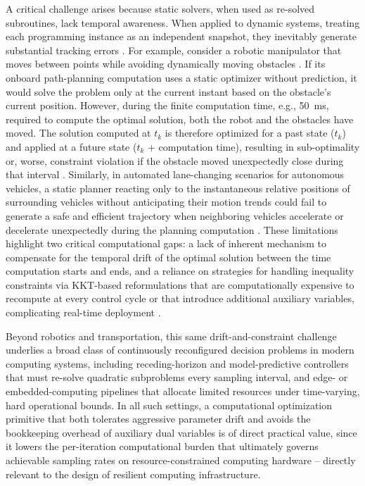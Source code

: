 \documentclass[pdflatex,sn-mathphys,Numbered]{sn-jnl}
\theoremstyle{thmstyleone}
\theoremstyle{thmstyletwo}
\theoremstyle{thmstylethree}
\begin{document}
A critical challenge arises because static solvers, when used as re-solved subroutines, lack temporal awareness. When applied to dynamic systems, treating each programming instance as an independent snapshot, they inevitably generate substantial tracking errors \cite{S4456,nn34, S4fw4}. For example, consider a robotic manipulator that moves between points while avoiding dynamically moving obstacles \cite{rbmm,rbm3Rm}. If its onboard path-planning computation uses a static optimizer without prediction, it would solve the problem only at the current instant based on the obstacle's current position. However, during the finite computation time, e.g., 50~ms, required to compute the optimal solution, both the robot and the obstacles have moved. The solution computed at $t_k$ is therefore optimized for a past state ($t_k$) and applied at a future state ($t_k$ + computation time), resulting in sub-optimality or, worse, constraint violation if the obstacle moved unexpectedly close during that interval \cite{rbmmr4,xy111}. Similarly, in automated lane-changing scenarios for autonomous vehicles, a static planner reacting only to the instantaneous relative positions of surrounding vehicles without anticipating their motion trends could fail to generate a safe and efficient trajectory when neighboring vehicles accelerate or decelerate unexpectedly during the planning computation \cite{tiv124}. These limitations highlight two critical computational gaps: a lack of inherent mechanism to compensate for the temporal drift of the optimal solution between the time computation starts and ends, and a reliance on strategies for handling inequality constraints via KKT-based reformulations that are computationally expensive to recompute at every control cycle or that introduce additional auxiliary variables, complicating real-time deployment \cite{lfyy12,lj11}.

Beyond robotics and transportation, this same drift-and-constraint challenge underlies a broad class of continuously reconfigured decision problems in modern computing systems, including receding-horizon and model-predictive controllers that must re-solve quadratic subproblems every sampling interval, and edge- or embedded-computing pipelines that allocate limited resources under time-varying, hard operational bounds. In all such settings, a computational optimization primitive that both tolerates aggressive parameter drift and avoids the bookkeeping overhead of auxiliary dual variables is of direct practical value, since it lowers the per-iteration computational burden that ultimately governs achievable sampling rates on resource-constrained computing hardware -- directly relevant to the design of resilient computing infrastructure.
\end{document}
